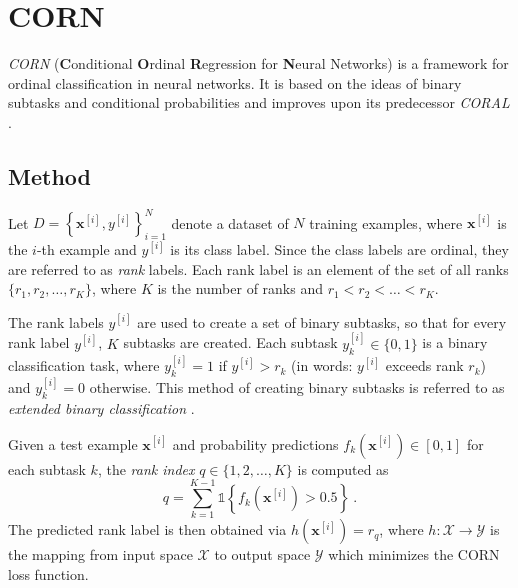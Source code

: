 \section{CORN}
\emph{CORN} (\textbf{C}onditional \textbf{O}rdinal \textbf{R}egression for \textbf{N}eural Networks) \cite{corn}
is a framework for ordinal classification in neural networks.
It is based on the ideas of binary subtasks and conditional probabilities
and improves upon its predecessor \emph{CORAL} \cite{coral}.



\subsection{Method} \label{sec:corn:method}

Let $D = \left\{ \mathbf{x}^{[i]}, y^{[i]} \right\}_{i=1}^N$ denote a dataset of $N$ training examples,
where $\mathbf{x}^{[i]}$ is the $i$-th example and $y^{[i]}$ is its class label.
Since the class labels are ordinal, they are referred to as \emph{rank} labels.
Each rank label is an element of the set of all ranks $\{r_1, r_2, \ldots, r_K\}$,
  where
  $K$ is the number of ranks
  and $r_1 < r_2 < \ldots < r_K$.

The rank labels $y^{[i]}$ are used to create a set of binary subtasks,
so that for every rank label $y^{[i]}$,
$K$ subtasks are created. %
Each subtask $y^{[i]}_k \in \{0, 1\}$ is a binary classification task,
  where
    $y^{[i]}_k = 1$ if $y^{[i]} > r_k$ (in words: {$y^{[i]}$ exceeds rank $r_k$})
    and $y^{[i]}_k = 0$ otherwise.
This method of creating binary subtasks is referred to as \emph{extended binary classification} \cite{extended_binary}.

Given a test example $\mathbf{x}^{[i]}$
and probability predictions $f_k(\mathbf{x}^{[i]}) \in [0,1]$ for each subtask $k$,
the \emph{rank index} $q \in \{1, 2, \ldots, K\}$ is computed as
\begin{equation}
  q = \sum_{k=1}^{K-1} \mathbb{1}\left\{f_k(\mathbf{x}^{[i]}) > 0.5\right\} \ .
\end{equation}
The predicted rank label is then obtained via
$h(\mathbf{x}^{[i]}) = r_q$,
where $h: \mathcal{X} \to \mathcal{Y}$ is the mapping from input space $\mathcal{X}$ to output space $\mathcal{Y}$ %
which minimizes the CORN loss function.



